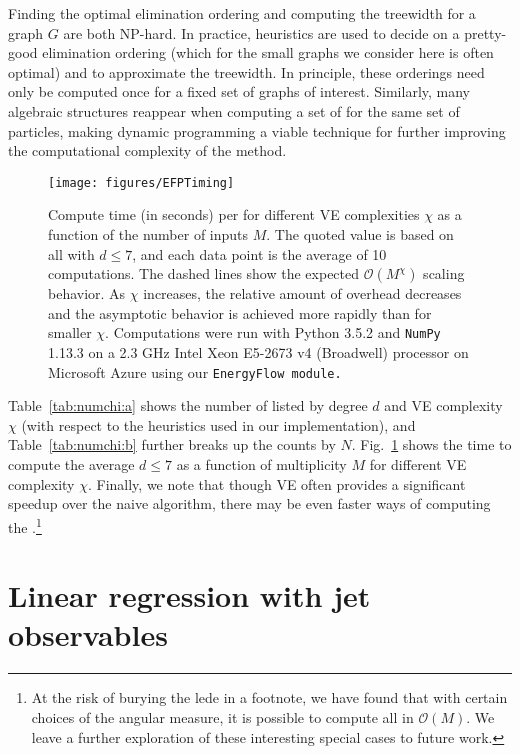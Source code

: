 \documentclass[letterpaper,11pt]{article}
\providecommand{\href}[2]{#2}
\DeclareRobustCommand{\Tab}[1]{Table~\ref{#1}}
\DeclareRobustCommand{\Fig}[1]{Fig.~\ref{#1}}
\newcommand{\B}{\text{EFP}\xspace}
\newcommand{\Bs}{\text{EFPs}\xspace}
\begin{document}
Finding the optimal elimination ordering and computing the treewidth for a graph $G$ are both NP-hard. 
%
In practice, heuristics are used to decide on a pretty-good elimination ordering (which for the small graphs we consider here is often optimal) and to approximate the treewidth. 
%
In principle, these orderings need only be computed once for a fixed set of graphs of interest. 
%
Similarly, many algebraic structures reappear when computing a set of \Bs for the same set of particles, making dynamic programming a viable technique for further improving the computational complexity of the method.

\begin{figure}[t]
\centering
\texttt{[image: figures/EFPTiming]}
\caption{Compute time (in seconds) per \B for different VE complexities $\chi$ as a function of the number of inputs $M$.  The quoted value is based on all \Bs with $d\le7$, and each data point is the average of 10 computations.  The dashed lines show the expected $\mathcal{O}(M^\chi)$ scaling behavior.  As $\chi$ increases, the relative amount of overhead decreases and the asymptotic behavior is achieved more rapidly than for smaller $\chi$. Computations were run with Python 3.5.2 and {\tt NumPy} 1.13.3 on a 2.3 GHz Intel Xeon E5-2673 v4 (Broadwell) processor on Microsoft Azure using our \href{https://pkomiske.github.io/EnergyFlow}{\tt EnergyFlow} module.}
\label{fig:times}
\end{figure}

\Tab{tab:numchi:a} shows the number of \Bs listed by degree $d$ and VE complexity $\chi$ (with respect to the heuristics used in our implementation), and \Tab{tab:numchi:b} further breaks up the \B counts by $N$. 
%
\Fig{fig:times} shows the time to compute the average $d\le7$ \B as a function of multiplicity $M$ for different VE complexity $\chi$. 
%
Finally, we note that though VE often provides a significant speedup over the naive algorithm, there may be even faster ways of computing the \Bs.\footnote{At the risk of burying the lede in a footnote, we have found that with certain choices of the angular measure, it is possible to compute all \Bs in $\mathcal O(M)$.  We leave a further exploration of these interesting special cases to future work.}


\section{Linear regression with jet observables}
\label{sec:linreg}
\end{document}
